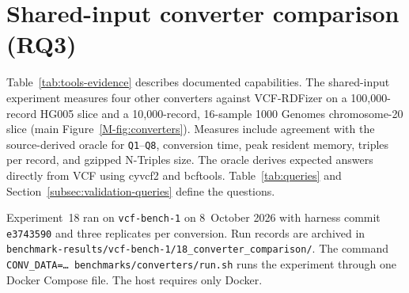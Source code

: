 \documentclass[11pt]{article}
\begin{document}
\section{Shared-input converter comparison (RQ3)}\label{sec:converters}
Table~\ref{tab:tools-evidence} describes documented capabilities.
The shared-input experiment measures four other converters against VCF-RDFizer on a 100,000-record HG005 slice and a 10,000-record, 16-sample 1000 Genomes chromosome-20 slice (main Figure~\ref{M-fig:converters}).
Measures include agreement with the source-derived oracle for \texttt{Q1}--\texttt{Q8}, conversion time, peak resident memory, triples per record, and gzipped N-Triples size.
The oracle derives expected answers directly from VCF using cyvcf2 and bcftools.
Table~\ref{tab:queries} and Section~\ref{subsec:validation-queries} define the questions.

Experiment~18 ran on \texttt{vcf-bench-1} on 8~October 2026 with harness commit \texttt{e3743590} and three replicates per conversion.
Run records are archived in \nolinkurl{benchmark-results/vcf-bench-1/18_converter_comparison/}.
The command \texttt{CONV\_DATA=\ldots{} benchmarks/converters/run.sh} runs the experiment through one Docker Compose file.
The host requires only Docker.
\end{document}
